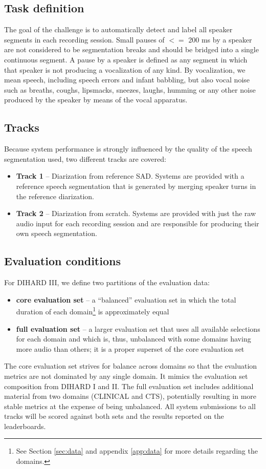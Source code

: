 \documentclass{article}
\begin{document}
\subsection{Task definition}
The goal of the challenge is to automatically detect and label all speaker segments in each recording session. Small pauses of $<=$ 200 ms by a speaker are not considered to be segmentation breaks and should be bridged into a single continuous segment. A pause by a speaker is defined as any segment in which that speaker is not producing a vocalization of any kind. By vocalization, we mean speech, including speech errors and infant babbling, but also vocal noise such as breaths, coughs, lipsmacks, sneezes, laughs, humming or any other noise produced by the speaker by means of the vocal apparatus.


\subsection{Tracks}
Because  system  performance  is  strongly  influenced  by  the  quality  of  the speech segmentation used, two different tracks are covered:
%
    \begin{itemize}
        \item {\bf Track 1}  --  Diarization from reference SAD. Systems are provided with a reference speech segmentation that is generated by merging speaker turns in the reference diarization.
        \item {\bf Track 2}  --  Diarization from scratch. Systems are provided with just the raw audio input for each recording session and are responsible for producing their own speech segmentation.
    \end{itemize}


\subsection{Evaluation conditions}
\label{sec:task:test}
For DIHARD III, we define two partitions of the evaluation data:
%
    \begin{itemize}
        \item {\bf core evaluation set}  --  a ``balanced'' evaluation set in which the total duration of each domain\footnote{See Section \ref{sec:data} and appendix \ref{app:data} for more details regarding the domains.} is approximately equal
        \item {\bf full evaluation set}  --  a larger evaluation set that uses all available selections for each domain and which is, thus, unbalanced with some domains having more audio than others; it is a proper superset of the core evaluation set
    \end{itemize}
%
The core evaluation set strives for balance across domains so that the evaluation metrics are not dominated by any single domain. It mimics the evaluation set composition from DIHARD I and II. The full evaluation set includes additional material from two domains (CLINICAL and CTS), potentially resulting in more stable metrics at the expense of being unbalanced. All system submissions to all tracks will be scored against both sets and the results reported on the leaderboards.
\end{document}
